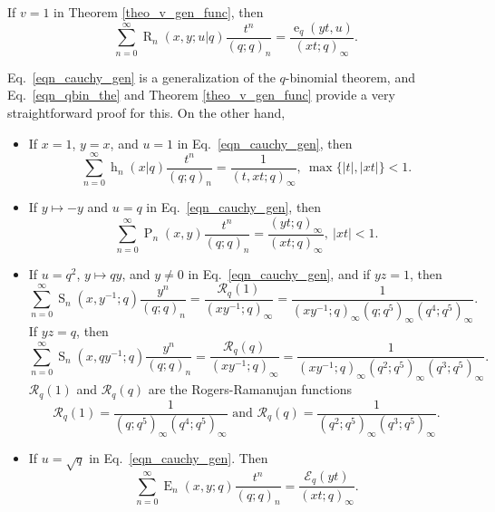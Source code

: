 \documentclass{cimart}
\DeclareMathOperator{\ope}{e}
\DeclareMathOperator{\opE}{E}
\DeclareMathOperator{\oph}{h}
\DeclareMathOperator{\opP}{P}
\DeclareMathOperator{\opR}{R}
\DeclareMathOperator{\opS}{S}
\begin{document}
\begin{corollary}\label{coro6}
If $v=1$ in Theorem \ref{theo_v_gen_func}, then
\begin{equation}\label{eqn_cauchy_gen}
    \sum_{n=0}^{\infty}\opR_{n}(x,y;u|q)\frac{t^n}{(q;q)_{n}}=\frac{\ope_{q}(yt,u)}{(xt;q)_{\infty}}.
\end{equation}    
\end{corollary}
Eq.~\eqref{eqn_cauchy_gen} is a generalization of the $q$-binomial theorem, and Eq.~\eqref{eqn_qbin_the} and Theorem \ref{theo_v_gen_func} provide a very straightforward proof for this. 
On the other hand,
\begin{itemize}
    \item 
    If $x=1$, $y=x$, and $u=1$ in Eq.~\eqref{eqn_cauchy_gen}, then 
\begin{equation*}
    \sum_{n=0}^{\infty}\oph_{n}(x|q)\frac{t^n}{(q;q)_{n}}=\frac{1}{(t,x t;q)_{\infty}},\ \max\{\vert t\vert,\vert xt\vert\}<1.
\end{equation*}
\item 
If $y\mapsto-y$ and $u=q$ in Eq.~\eqref{eqn_cauchy_gen}, then
\begin{equation*}
    \sum_{n=0}^{\infty}\opP_{n}(x,y)\frac{t^n}{(q;q)_{n}}=\frac{(yt;q)_{\infty}}{(x t;q)_{\infty}},\ \vert xt\vert<1.
\end{equation*}
\item 
If $u=q^2$, $y\mapsto qy$, and $y\neq0$ in Eq.~\eqref{eqn_cauchy_gen}, and if $yz=1$, then
\begin{equation}
    \sum_{n=0}^{\infty}\opS_{n}(x,y^{-1};q)\frac{y^n}{(q;q)_{n}}=\frac{\mathcal{R}_{q}(1)}{(xy^{-1};q)_{\infty}}=\frac{1}{(xy^{-1};q)_{\infty}(q;q^5)_{\infty}(q^4;q^5)_{\infty}}.
\end{equation}
If $yz=q$, then
\begin{equation}
    \sum_{n=0}^{\infty}\opS_{n}(x,qy^{-1};q)\frac{y^n}{(q;q)_{n}}=\frac{\mathcal{R}_{q}(q)}{(xy^{-1};q)_{\infty}}=\frac{1}{(xy^{-1};q)_{\infty}(q^2;q^5)_{\infty}(q^3;q^5)_{\infty}}.
\end{equation}
$\mathcal{R}_{q}(1)$ and $\mathcal{R}_{q}(q)$ are the Rogers-Ramanujan functions \cite{ramanujan,rogers}
\begin{equation}
    \mathcal{R}_{q}(1)=\frac{1}{(q;q^5)_{\infty}(q^4;q^5)_{\infty}
    }\text{  and  }\mathcal{R}_{q}(q)=\frac{1}{(q^2;q^5)_{\infty}(q^3;q^5)_{\infty}
    }.
\end{equation}
\item If $u=\sqrt{q}$ in Eq.~\eqref{eqn_cauchy_gen}. Then
\begin{equation}
    \sum_{n=0}^{\infty}\opE_{n}(x,y;q)\frac{t^n}{(q;q)_{n}}=\frac{\mathcal{E}_{q}(yt)}{(xt;q)_{\infty}}.
\end{equation}
\end{itemize}
\end{document}
